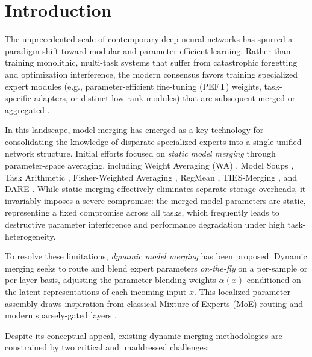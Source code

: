 \section{Introduction}
\label{sec:intro}

The unprecedented scale of contemporary deep neural networks has spurred a paradigm shift toward modular and parameter-efficient learning. Rather than training monolithic, multi-task systems that suffer from catastrophic forgetting and optimization interference, the modern consensus favors training specialized expert modules (e.g., parameter-efficient fine-tuning (PEFT) weights, task-specific adapters, or distinct low-rank modules) that are subsequent merged or aggregated \cite{houlsby2019parameter, hu2021lora, he2021towards}. 

In this landscape, model merging has emerged as a key technology for consolidating the knowledge of disparate specialized experts into a single unified network structure. Initial efforts focused on \emph{static model merging} through parameter-space averaging, including Weight Averaging (WA) \cite{mcmahan2017communication, izmailov2018averaging}, Model Soups \cite{wortsman2022model}, Task Arithmetic \cite{ilharco2022editing}, Fisher-Weighted Averaging \cite{matena2022merging}, RegMean \cite{jin2022dataless}, TIES-Merging \cite{yadav2023ties}, and DARE \cite{yu2023language}. While static merging effectively eliminates separate storage overheads, it invariably imposes a severe compromise: the merged model parameters are static, representing a fixed compromise across all tasks, which frequently leads to destructive parameter interference and performance degradation under high task-heterogeneity.

To resolve these limitations, \emph{dynamic model merging} has been proposed. Dynamic merging seeks to route and blend expert parameters \emph{on-the-fly} on a per-sample or per-layer basis, adjusting the parameter blending weights $\alpha(x)$ conditioned on the latent representations of each incoming input $x$. This localized parameter assembly draws inspiration from classical Mixture-of-Experts (MoE) routing \cite{jacobs1991adaptive, jordan1994hierarchical} and modern sparsely-gated layers \cite{shazeer2017outrageously, fedus2022switch}. 

Despite its conceptual appeal, existing dynamic merging methodologies are constrained by two critical and unaddressed challenges:

